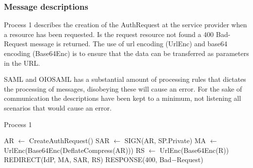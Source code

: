 \documentclass[twosided]{report}
\begin{document}
\subsubsection{Message descriptions}
Process 1 describes the creation of the AuthRequest at the service provider when a resource has been requested. Is the request resource not found a 400 Bad-Request message is returned. The use of url encoding (UrlEnc) and base64 encoding (Base64Enc) is to ensure that the data can be transferred as parameters in the URL.
\par
SAML and OIOSAML has a substantial amount of processing rules that dictates the processing of messages, disobeying these will cause an error. For the sake of communication the descriptions have been kept to a minimum, not listening all scenarios that would cause an error.

\begin{algorithm}[H]
	\caption{Process 1}
	\begin{algorithmic}
		\STATE AR $\leftarrow$ CreateAuthRequest()
		\STATE SAR $\leftarrow$ SIGN(AR, SP.Private)
		\STATE MA $\leftarrow$ UrlEnc(Base64Enc(DeflateCompress(AR)))
		\STATE RS $\leftarrow$ UrlEnc(Base64Enc(R))
		\RETURN REDIRECT(IdP, MA, SAR, RS)
	\ELSE
		\RETURN RESPONSE(400, Bad−Request)
	\ENDIF
	\end{algorithmic}
\end{algorithm}
\end{document}
